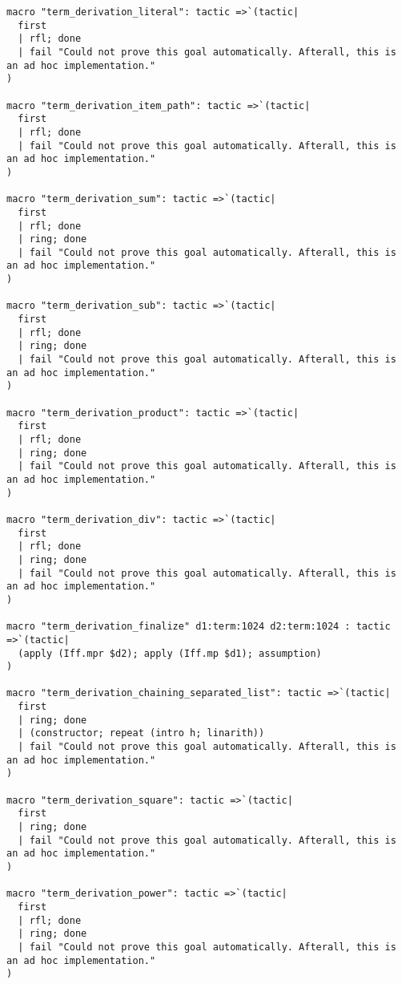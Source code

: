 \documentclass{article}
\begin{document}
\begin{tcolorbox}[colback=white!10, width=\linewidth]
\begin{lstlisting}[language=Lean4]
macro "term_derivation_literal": tactic =>`(tactic|
  first
  | rfl; done
  | fail "Could not prove this goal automatically. Afterall, this is an ad hoc implementation."
)

macro "term_derivation_item_path": tactic =>`(tactic|
  first
  | rfl; done
  | fail "Could not prove this goal automatically. Afterall, this is an ad hoc implementation."
)

macro "term_derivation_sum": tactic =>`(tactic|
  first
  | rfl; done
  | ring; done
  | fail "Could not prove this goal automatically. Afterall, this is an ad hoc implementation."
)

macro "term_derivation_sub": tactic =>`(tactic|
  first
  | rfl; done
  | ring; done
  | fail "Could not prove this goal automatically. Afterall, this is an ad hoc implementation."
)

macro "term_derivation_product": tactic =>`(tactic|
  first
  | rfl; done
  | ring; done
  | fail "Could not prove this goal automatically. Afterall, this is an ad hoc implementation."
)

macro "term_derivation_div": tactic =>`(tactic|
  first
  | rfl; done
  | ring; done
  | fail "Could not prove this goal automatically. Afterall, this is an ad hoc implementation."
)

macro "term_derivation_finalize" d1:term:1024 d2:term:1024 : tactic =>`(tactic|
  (apply (Iff.mpr $d2); apply (Iff.mp $d1); assumption)
)

macro "term_derivation_chaining_separated_list": tactic =>`(tactic|
  first
  | ring; done
  | (constructor; repeat (intro h; linarith))
  | fail "Could not prove this goal automatically. Afterall, this is an ad hoc implementation."
)

macro "term_derivation_square": tactic =>`(tactic|
  first
  | ring; done
  | fail "Could not prove this goal automatically. Afterall, this is an ad hoc implementation."
)

macro "term_derivation_power": tactic =>`(tactic|
  first
  | rfl; done
  | ring; done
  | fail "Could not prove this goal automatically. Afterall, this is an ad hoc implementation."
)


\end{lstlisting}
\end{tcolorbox}
\end{document}
